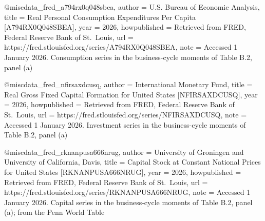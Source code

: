 @misc{data_fred_a794rx0q048sbea,
  author       = {{U.S. Bureau of Economic Analysis}},
  title        = {Real Personal Consumption Expenditures Per Capita [{A794RX0Q048SBEA}]},
  year         = {2026},
  howpublished = {Retrieved from {FRED}, Federal Reserve Bank of St.\ Louis},
  url          = {https://fred.stlouisfed.org/series/A794RX0Q048SBEA},
  note         = {Accessed 1 January 2026. Consumption series in the business-cycle moments of Table B.2, panel (a)}
}

@misc{data_fred_nfirsaxdcusq,
  author       = {{International Monetary Fund}},
  title        = {Real Gross Fixed Capital Formation for United States [{NFIRSAXDCUSQ}]},
  year         = {2026},
  howpublished = {Retrieved from {FRED}, Federal Reserve Bank of St.\ Louis},
  url          = {https://fred.stlouisfed.org/series/NFIRSAXDCUSQ},
  note         = {Accessed 1 January 2026. Investment series in the business-cycle moments of Table B.2, panel (a)}
}

@misc{data_fred_rknanpusa666nrug,
  author       = {{University of Groningen and University of California, Davis}},
  title        = {Capital Stock at Constant National Prices for United States [{RKNANPUSA666NRUG}]},
  year         = {2026},
  howpublished = {Retrieved from {FRED}, Federal Reserve Bank of St.\ Louis},
  url          = {https://fred.stlouisfed.org/series/RKNANPUSA666NRUG},
  note         = {Accessed 1 January 2026. Capital series in the business-cycle moments of Table B.2, panel (a); from the Penn World Table}
}

